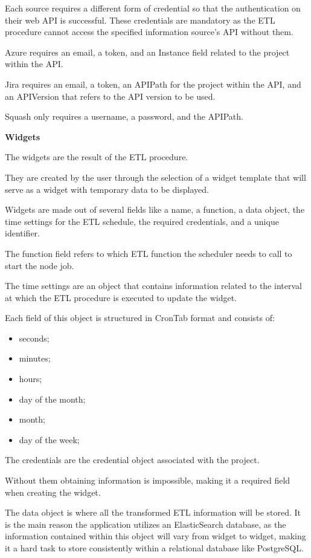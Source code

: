 \documentclass[a4paper,twoside,10pt]{report}
\begin{document}
Each source requires a different form of credential so that the authentication on their web API is successful. These credentials are mandatory as the ETL procedure cannot access the specified information source's API without them.

Azure requires an email, a token, and an Instance field related to the project within the API.

Jira requires an email, a token, an APIPath for the project within the API, and an APIVersion that refers to the API version to be used.

Squash only requires a username, a password, and the APIPath.




\textbf{Widgets}

The widgets are the result of the ETL procedure.

They are created by the user through the selection of a widget template that will serve as a widget with temporary data to be displayed.

Widgets are made out of several fields like a name, a function, a data object, the time settings for the ETL schedule, the required credentials, and a unique identifier.

The function field refers to which ETL function the scheduler needs to call to start the node job.

The time settings are an object that contains information related to the interval at which the ETL procedure is executed to update the widget. 

Each field of this object is structured in CronTab format and consists of:
\begin{itemize}
  \item seconds;
  \item minutes;
  \item hours;
  \item day of the month;
  \item month;
  \item day of the week;
\end{itemize}
The credentials are the credential object associated with the project.

Without them obtaining information is impossible, making it a required field when creating the widget.

The data object is where all the transformed ETL information will be stored. It is the main reason the application utilizes an ElasticSearch database, as the information contained within this object will vary from widget to widget, making it a hard task to store consistently within a relational database like PostgreSQL.
\end{document}
